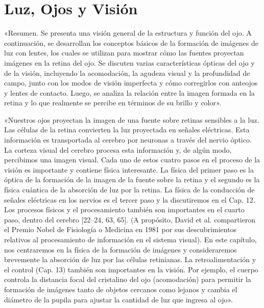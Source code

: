 \documentclass[12pt]{book}
\begin{document}
\setcounter{chapter}{10}

\chapter{Luz, Ojos y Visión}
\label{chap:11}

«Resumen. Se presenta una visión general de la estructura y función del ojo. A continuación, se desarrollan los conceptos básicos de la formación de imágenes de luz con lentes, los cuales se utilizan para mostrar cómo las fuentes proyectan imágenes en la retina del ojo. Se discuten varias características ópticas del ojo y de la visión, incluyendo la acomodación, la agudeza visual y la profundidad de campo, junto con los modos de visión imperfecta y cómo corregirlos con anteojos y lentes de contacto. Luego, se analiza la relación entre la imagen formada en la retina y lo que realmente se percibe en términos de su brillo y color».

«Nuestros ojos proyectan la imagen de una fuente sobre retinas sensibles a la luz. Las células de la retina convierten la luz proyectada en señales eléctricas. Esta información es transportada al cerebro por neuronas a través del nervio óptico. La corteza visual del cerebro procesa esta información y, de algún modo, percibimos una imagen visual. Cada uno de estos cuatro pasos en el proceso de la visión es importante y contiene física interesante. La física del primer paso es la óptica de la formación de la imagen de la fuente sobre la retina y el segundo es la física cuántica de la absorción de luz por la retina. La física de la conducción de señales eléctricas en los nervios es el tercer paso y la discutiremos en el Cap. 12. Los procesos físicos y el procesamiento también son importantes en el cuarto paso, dentro del cerebro [22--24, 63, 65]. (A propósito, David et al. compartieron el Premio Nobel de Fisiología o Medicina en 1981 por sus descubrimientos relativos al procesamiento de información en el sistema visual). En este capítulo, nos centraremos en la física de la formación de imágenes y consideraremos brevemente la absorción de luz por las células retinianas. La retroalimentación y el control (Cap. 13) también son importantes en la visión. Por ejemplo, el cuerpo controla la distancia focal del cristalino del ojo (acomodación) para permitir la formación de imágenes tanto de objetos cercanos como lejanos y cambia el diámetro de la pupila para ajustar la cantidad de luz que ingresa al ojo».
\end{document}
